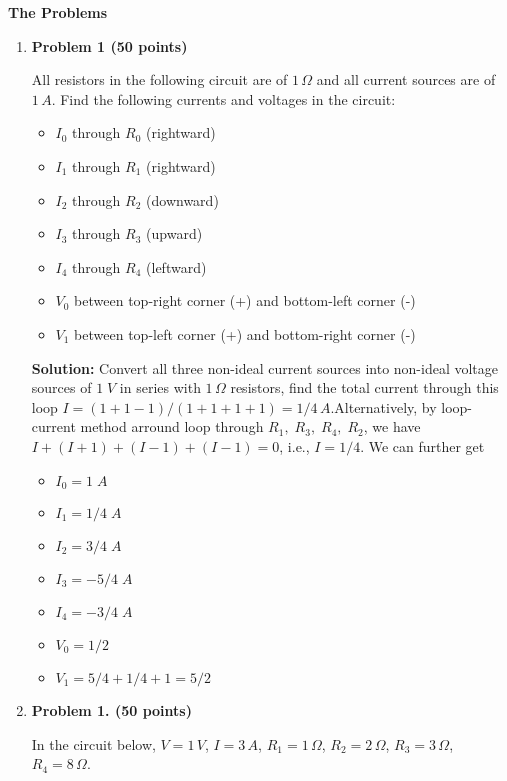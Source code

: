 {\bf The Problems}
\begin{enumerate}

\item {\bf Problem 1 (50 points)}

  All resistors in the following circuit are of $1\,\Omega$
  and all current sources are of $1\,A$. Find the following
  currents and voltages in the circuit:
  \begin{itemize}
  \item $I_0$ through $R_0$ (rightward)
  \item $I_1$ through $R_1$ (rightward)
  \item $I_2$ through $R_2$ (downward)
  \item $I_3$ through $R_3$ (upward)
  \item $I_4$ through $R_4$ (leftward)
  \item $V_0$ between top-right corner (+) and bottom-left corner (-)    
  \item $V_1$ between top-left corner (+) and bottom-right corner (-)    
  \end{itemize}


  {\bf Solution:}  Convert all three non-ideal current sources
  into non-ideal voltage sources of $1\;V$ in series with $1\,\Omega$
  resistors, find the total current through this loop 
  $I=(1+1-1)/(1+1+1+1)=1/4\,A$.Alternatively, by loop-current 
  method arround loop through $R_1,\;R_3,\;R_4,\;R_2$, we have
  $I+(I+1)+(I-1)+(I-1)=0$, i.e., $I=1/4$. We can further get
  \begin{itemize}
  \item $I_0=1\;A$
  \item $I_1=1/4\;A$
  \item $I_2=3/4\;A$
  \item $I_3=-5/4\;A$
  \item $I_4=-3/4\;A$
  \item $V_0=1/2$
  \item $V_1=5/4+1/4+1=5/2$
  \end{itemize}
  

\item {\bf Problem 1. (50 points)} 

  In the circuit below, $V=1\,V$, $I=3\,A$, $R_1=1\,\Omega$,
  $R_2=2\,\Omega$, $R_3=3\,\Omega$, $R_4=8\,\Omega$. 



\end{enumerate}
